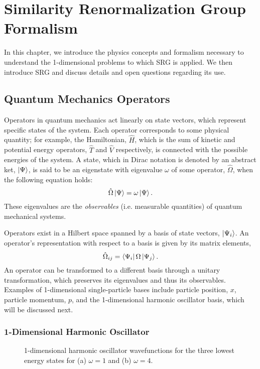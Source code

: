 \chapter{Similarity Renormalization Group Formalism}\label{srg_formalism}

In this chapter, we introduce the physics concepts and formalism necessary to understand the 1-dimensional problems to which SRG is applied. We then introduce SRG and discuss details and open questions regarding its use.

\section{Quantum Mechanics Operators}

Operators in quantum mechanics act linearly on state vectors, which represent specific states of the system. Each operator corresponds to some physical quantity; for example, the Hamiltonian, $\hat{H}$, which is the sum of kinetic and potential energy operators, $\hat{T}$ and $\hat{V}$ respectively, is connected with the possible energies of the system. A state, which in Dirac notation is denoted by an abstract ket, $\ket{\Psi}$, is said to be an eigenstate with eigenvalue $\omega$ of some operator, $\hat{\Omega}$, when the following equation holds:
\begin{equation}
\hat{\Omega}\ket{\Psi} = \omega\ket{\Psi}.
\end{equation}
These eigenvalues are the \textit{observables} (i.e. measurable quantities) of quantum mechanical systems.

Operators exist in a Hilbert space spanned by a basis of state vectors, $\ket{\Psi_i}$. An operator's representation with respect to a basis is given by its matrix elements,
\begin{equation}
\hat{\Omega}_{ij} = \bra{\Psi_i}\Omega\ket{\Psi_j}.
\end{equation}
An operator can be transformed to a different basis through a unitary transformation, which preserves its eigenvalues and thus its observables. Examples of 1-dimensional single-particle bases include particle position, $x$, particle momentum, $p$, and the 1-dimensional harmonic oscillator basis, which will be discussed next.

\subsection{1-Dimensional Harmonic Oscillator}

\begin{figure}[t]
\begin{center}
\end{center}
\caption{1-dimensional harmonic oscillator wavefunctions for the three lowest energy states for (a) $\omega=1$ and (b) $\omega=4$.}
\label{fig:ho_wf}
\end{figure}

